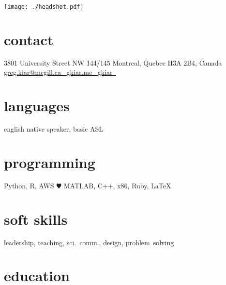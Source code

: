 \documentclass[]{friggeri-cv} %
\begin{document}


\begin{aside} %
\texttt{[image: ./headshot.pdf]}
\section{contact}
3801 University Street
NW 144/145
Montreal, Quebec
H3A 2B4, Canada
~
\href{mailto:gkiar07@gmail.com}{greg.kiar@mcgill.ca~{\color{red} \faEnvelope}}
\href{http://gkiar.github.io}{gkiar.me~{\color{lightblue} \faGlobe}}
\href{http://github.com/gkiar}{gkiar~{\color{purple} \faGithub}}
\href{https://twitter.com/g_kiar}{{\color{blue} \faTwitter}} \href{https://www.linkedin.com/in/gregkiar}{{\color{green} \faLinkedin}} \href{https://publons.com/author/1305375/gregory-kiar#profile}{{\color{plubblue} \aiPublons}} \href{http://orcid.org/0000-0001-8915-496X}{{\color{orcidgreen} \aiOrcid}} \href{https://scholar.google.com/citations?user=ztw6g7kAAAAJ&hl=en}{{\color{googred} \aiGoogleScholar}} \href{https://www.researchgate.net/profile/Gregory_Kiar}{{\color{gateteal} \aiResearchGate}}
\section{languages}
english native speaker,
basic ASL
\section{programming}
Python, R, AWS {\color{red} $\varheartsuit$}
MATLAB, C++, x86,
Ruby, LaTeX
\section{soft skills}
leadership, teaching, sci.~comm., design, problem~solving
\end{aside}


\section{education}
\end{document}
